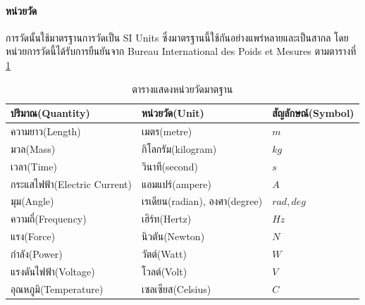 \paragraph*{หน่วยวัด}
การวัดนั้นใช้มาตรฐานการวัดเป็น SI Units ซึ่งมาตรฐานนี้ใช้กันอย่างแพร่หลายและเป็นสากล โดยหน่วยการวัดนี้ได้รับการยืนยันจาก
Bureau International des Poids et Mesures ตามตารางที่ \ref{tab:standart_unit}

\begin{table}[!ht]
	\centering
	\begin{tabular}{| l | l | l |}
		\hline
		ปริมาณ(Quantity)                     & หน่วยวัด(Unit)                      & สัญลักษณ์(Symbol) \\
		\hline
		ความยาว(Length)                    & เมตร(metre)                                 & $m$                                 \\
		มวล(Mass)                                  & กิโลกรัม(kilogram)                  & $kg$                                \\
		เวลา(Time)                               & วินาที(second)                          & $s$                                 \\
		กระแสไฟฟ้า(Electric Current) & แอมแปร์(ampere)                       & $A$                                 \\
		มุม(Angle)                                 & เรเดียน(radian), องศา(degree) & $rad, deg$                          \\
		ความถี่(Frequency)                 & เฮิร์ท(Hertz)                           & $Hz$                                \\
		แรง(Force)                                 & นิวตัน(Newton)                          & $N$                                 \\
		กำลัง(Power)                           & วัตต์(Watt)                               & $W$                                 \\
		แรงดันไฟฟ้า(Voltage)       & โวลต์(Volt)                               & $V$                                 \\
		อุณหภูมิ(Temperature)            & เซลเซียส(Celsius)                   & $C$                                 \\
		\hline
	\end{tabular}
	\caption{ตารางแสดงหน่วยวัดมาตฐาน}
	\label{tab:standart_unit}
\end{table}

